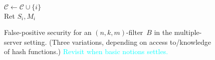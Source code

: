 \begin{figure}
{{\medskip
{}\\
$\mathcal{C} \gets \mathcal{C} \cup \{i\}$\\
Ret $S_i,M_i$\\
}
}
\caption{False-positive security for an $(n,k,m)$-filter~$B$ in the multiple-server setting.  (Three variations, depending on access to/knowledge of hash functions.) \textcolor{cyan}{Revisit when basic notions settles.}}
\label{fig:fp-filter}
\end{figure}